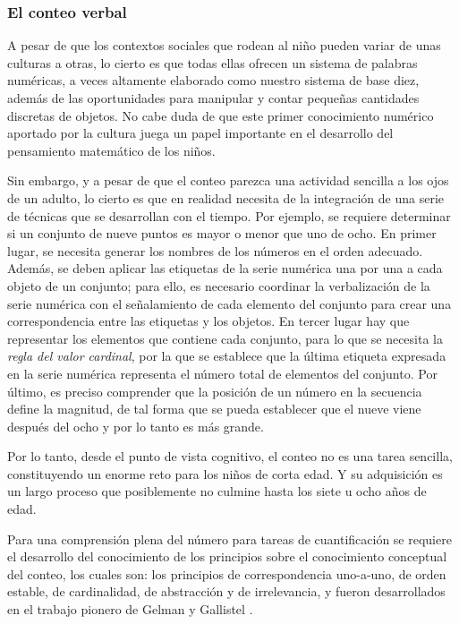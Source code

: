 \documentclass{article}
\begin{document}
\subsubsection{El conteo verbal}
A pesar de que los contextos sociales que rodean al niño pueden variar de unas culturas a otras, lo cierto es que todas ellas ofrecen un sistema de palabras numéricas, a veces altamente elaborado como nuestro sistema de base diez, además de las oportunidades para manipular y contar pequeñas cantidades discretas de objetos. No cabe duda de que este primer conocimiento numérico aportado por la cultura juega un papel importante en el desarrollo del pensamiento matemático de los niños.

Sin embargo, y a pesar de que el conteo parezca una actividad sencilla a los ojos de un adulto, lo cierto es que en realidad necesita de la integración de una serie de técnicas que se desarrollan con el tiempo. Por ejemplo, se requiere determinar si un conjunto de nueve puntos es mayor o menor que uno de ocho. En primer lugar, se necesita generar los nombres de los números en el orden adecuado. Además, se deben aplicar las etiquetas de la serie numérica una por una a cada objeto de un conjunto; para ello, es necesario coordinar la verbalización de la serie numérica con el señalamiento de cada elemento del conjunto para crear una correspondencia entre las etiquetas y los objetos. En tercer lugar hay que representar los elementos que contiene cada conjunto, para lo que se necesita la \emph{regla del valor cardinal}, por la que se establece que la última etiqueta expresada en la serie numérica representa el número total de elementos del conjunto. Por último, es preciso comprender que la posición de un número en la secuencia define la magnitud, de tal forma que se pueda establecer que el nueve viene después del ocho y por lo tanto es más grande.

Por lo tanto, desde el punto de vista cognitivo, el conteo no es una tarea sencilla, constituyendo un enorme reto para los niños de corta edad. Y su adquisición es un largo proceso que posiblemente no culmine hasta los siete u ocho años de edad.

Para una comprensión plena del número para tareas de cuantificación se requiere el desarrollo del conocimiento de los principios sobre el conocimiento conceptual del conteo, los cuales son: los principios de correspondencia uno-a-uno, de orden estable, de cardinalidad, de abstracción y de irrelevancia, y fueron desarrollados en el trabajo pionero de Gelman y Gallistel \cite{german1978child}.
\end{document}
